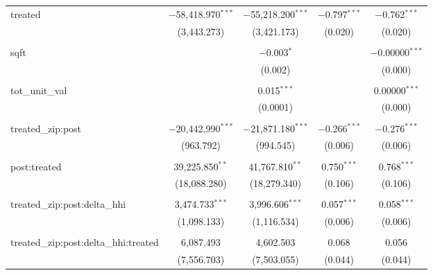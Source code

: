 \begin{table}[H]
{\begin{tabular}{@{\extracolsep{5pt}}lcccc}
  treated & $-$58,418.970$^{***}$ & $-$55,218.200$^{***}$ & $-$0.797$^{***}$ & $-$0.762$^{***}$ \\  

   & (3,443.273) & (3,421.173) & (0.020) & (0.020) \\  

   & & & & \\  

  sqft &  & $-$0.003$^{*}$ &  & $-$0.00000$^{***}$ \\  

   &  & (0.002) &  & (0.000) \\  

   & & & & \\  

  tot\_unit\_val &  & 0.015$^{***}$ &  & 0.00000$^{***}$ \\  

   &  & (0.0001) &  & (0.000) \\  

   & & & & \\  

  treated\_zip:post & $-$20,442.990$^{***}$ & $-$21,871.180$^{***}$ & $-$0.266$^{***}$ & $-$0.276$^{***}$ \\  

   & (963.792) & (994.545) & (0.006) & (0.006) \\  

   & & & & \\  

  post:treated & 39,225.850$^{**}$ & 41,767.810$^{**}$ & 0.750$^{***}$ & 0.768$^{***}$ \\  

   & (18,088.280) & (18,279.340) & (0.106) & (0.106) \\  

   & & & & \\  

  treated\_zip:post:delta\_hhi & 3,474.733$^{***}$ & 3,996.606$^{***}$ & 0.057$^{***}$ & 0.058$^{***}$ \\  

   & (1,098.133) & (1,116.534) & (0.006) & (0.006) \\  

   & & & & \\  

  treated\_zip:post:delta\_hhi:treated & 6,087.493 & 4,602.503 & 0.068 & 0.056 \\  

   & (7,556.703) & (7,503.055) & (0.044) & (0.044) \\  


\end{tabular}}
\end{table}
